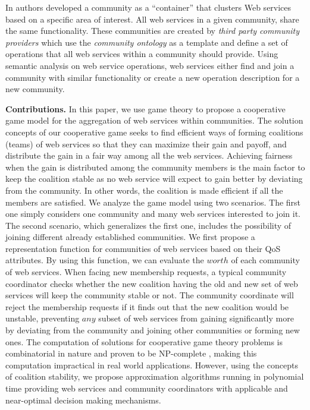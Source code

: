 \documentclass[10pt,journal,cspaper,compsoc]{IEEEtran}
\begin{document}
In \cite{Medjahed05adynamic} authors developed a community as a ``container'' that clusters Web services based on a specific area of interest. All web services in a given community, share the same functionality. These communities are created by \emph{third party community providers} which use the \emph{community ontology} as a template and define a set of operations that all web services within a community should provide. Using semantic analysis on web service operations, web services either find and join a community with similar functionality or create a new operation description for a new community.



\textbf{Contributions.} In this paper, we use game theory to
propose a cooperative game model for the aggregation of web
services within communities. The solution concepts of our
cooperative game seeks to find efficient ways of forming
coalitions (teams) of web services so that they can maximize their
gain and payoff, and distribute the gain in a fair way among all
the web services. Achieving fairness when the gain is distributed
among the community members is the main factor to keep the
coalition stable as no web service will expect to gain better by
deviating from the community. In other words, the coalition is
made efficient if all the members are satisfied. We analyze the
game model using two scenarios. The first one simply considers one
community and many web services interested to join it. The second
scenario, which generalizes the first one, includes the
possibility of joining different already established communities.
We first propose a representation function for communities of web
services based on their QoS attributes. By using this function, we
can evaluate the $worth$ of each community of web services. When
facing new membership requests, a typical community coordinator checks
whether the new coalition having the old and new set of web
services will keep the community stable or not. The community
coordinate will reject the membership requests if it finds out that
the new coalition would be unstable, preventing $any$ subset of
web services from gaining significantly more by deviating from the
community and joining other communities or forming new ones. The
computation of solutions for cooperative game theory problems is
combinatorial in nature and proven to be NP-complete
\cite{Algorithmic}, making this computation impractical in real
world applications. However, using the concepts of coalition
stability, we propose approximation algorithms running in
polynomial time providing web services and community coordinators with
applicable and near-optimal decision making mechanisms.
\end{document}
